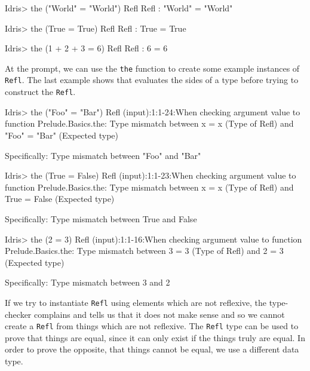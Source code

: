         \begin{code}[label={des:refl-egs}, caption={Examples of reflexivity}]
        Idris> the ("World" = "World") Refl
        Refl : "World" = "World"
        
        
        Idris> the (True = True) Refl
        Refl : True = True
        
        
        Idris> the (1 + 2 + 3 = 6) Refl
        Refl : 6 = 6
        \end{code}
        At the \Idris prompt, we can use the \texttt{the} function to create some example instances of \texttt{Refl}. The last example shows that \Idris evaluates the sides of a type before trying to construct the \texttt{Refl}.
    
        \newpage
    
        \begin{code}[label={des:not-refl}, caption={Things that are not reflexive}, escapeinside={(*}{*)}]
        Idris> the ("Foo" = "Bar") Refl
        (input):1:1-24:When checking argument value to function
        Prelude.Basics.the:
            Type mismatch between
                x = x (Type of Refl)
            and
                "Foo" = "Bar" (Expected type)
        
            Specifically:
                Type mismatch between
                    "Foo"
                and
                    "Bar"
        
        
        Idris> the (True = False) Refl
        (input):1:1-23:When checking argument value to function
        Prelude.Basics.the:
            Type mismatch between
                x = x (Type of Refl)
            and
                True = False (Expected type)
        
            Specifically:
                Type mismatch between
                    True
                and
                    False
        
        
        Idris> the (2 = 3) Refl
        (input):1:1-16:When checking argument value to function
        Prelude.Basics.the:
            Type mismatch between
                3 = 3 (Type of Refl)
            and
                2 = 3 (Expected type)
            
            Specifically:
                Type mismatch between
                    3
                and
                    2
        \end{code}
        If we try to instantiate \texttt{Refl} using elements which are not reflexive, the type-checker complains and tells us that it does not make sense and so we cannot create a \texttt{Refl} from things which are not reflexive. The \texttt{Refl} type can be used to prove that things are equal, since it can only exist if the things truly are equal. In order to prove the opposite, that things cannot be equal, we use a different data type.
    

